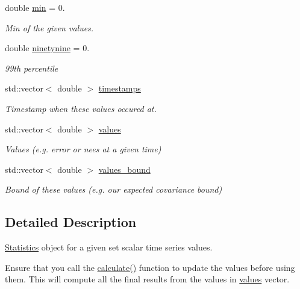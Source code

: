 \begin{DoxyCompactItemize}
\mbox{\label{structov__eval_1_1Statistics_ada14c28c46581e4e928f8eb7c86fdd06}} 
double \hyperlink{structov__eval_1_1Statistics_ada14c28c46581e4e928f8eb7c86fdd06}{min} = 0.
\begin{DoxyCompactList}\small\item\em Min of the given values. \end{DoxyCompactList}\item 
\mbox{\label{structov__eval_1_1Statistics_a61e02141acabdb35b6e9bc9c1722653f}} 
double \hyperlink{structov__eval_1_1Statistics_a61e02141acabdb35b6e9bc9c1722653f}{ninetynine} = 0.
\begin{DoxyCompactList}\small\item\em 99th percentile \end{DoxyCompactList}\item 
\mbox{\label{structov__eval_1_1Statistics_a017b8f3c767271f7d586468ec86fe2b4}} 
std\+::vector$<$ double $>$ \hyperlink{structov__eval_1_1Statistics_a017b8f3c767271f7d586468ec86fe2b4}{timestamps}
\begin{DoxyCompactList}\small\item\em Timestamp when these values occured at. \end{DoxyCompactList}\item 
\mbox{\label{structov__eval_1_1Statistics_a354bca50b835cca4be36ea1960561de7}} 
std\+::vector$<$ double $>$ \hyperlink{structov__eval_1_1Statistics_a354bca50b835cca4be36ea1960561de7}{values}
\begin{DoxyCompactList}\small\item\em Values (e.\+g. error or nees at a given time) \end{DoxyCompactList}\item 
\mbox{\label{structov__eval_1_1Statistics_a0ec5edc20462a1e6834547ed79d81377}} 
std\+::vector$<$ double $>$ \hyperlink{structov__eval_1_1Statistics_a0ec5edc20462a1e6834547ed79d81377}{values\+\_\+bound}
\begin{DoxyCompactList}\small\item\em Bound of these values (e.\+g. our expected covariance bound) \end{DoxyCompactList}\end{DoxyCompactItemize}


\subsection{Detailed Description}
\hyperlink{structov__eval_1_1Statistics}{Statistics} object for a given set scalar time series values. 

Ensure that you call the \hyperlink{structov__eval_1_1Statistics_ada896c0243989b2b8a366a0caa18a3c6}{calculate()} function to update the values before using them. This will compute all the final results from the values in \hyperlink{structov__eval_1_1Statistics_a354bca50b835cca4be36ea1960561de7}{values} vector. 